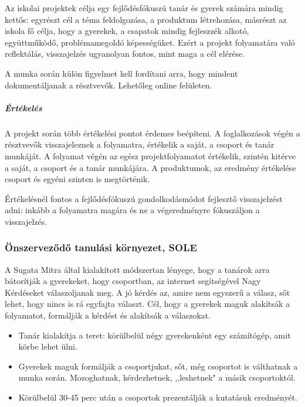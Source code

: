 Az iskolai projektek célja egy fejlődésfókuszú tanár és gyerek számára
mindig kettős: egyrészt cél a téma feldolgozása, a produktum
létrehozása, másrészt az iskola fő célja, hogy a gyerekek, a csapatok
mindig fejleszzék alkotó, együttműködő, problémamegoldó képességüket.
Ezért a projekt folyamatára való reflektálás, visszajelzés ugyanolyan
fontos, mint maga a cél elérése.

A munka során külön figyelmet kell fordítani arra, hogy mindent
dokumentáljanak a résztvevők. Lehetőleg online felületen.

\hypertarget{uxe9rtuxe9keluxe9s}{%
\subparagraph{Értékelés}\label{uxe9rtuxe9keluxe9s}}

A projekt során több értékelési pontot érdemes beépíteni. A
foglalkozások végén a résztvevők visszajeleznek a folyamatra, értékelik
a saját, a csoport és tanár munkáját. A folyamat végén az egész
projektfolyamatot értékelik, szintén kitérve a saját, a csoport és a
tanár munkájára. A produktumok, az eredmény értékelése csoport és egyéni
szinten is megtörténik.

Értékelésnél fontos a fejlődésfókuszú gondolkodásmódot fejlesztő
visszajelzést adni: inkább a folyamatra magára és ne a végeredményre
fókuszáljon a visszajelzés.

\hypertarget{uxf6nszervezux151dux151-tanuluxe1si-kuxf6rnyezet-sole}{%
\subsubsection{Önszerveződő tanulási környezet,
SOLE}\label{uxf6nszervezux151dux151-tanuluxe1si-kuxf6rnyezet-sole}}

A Sugata Mitra által kialakított módszertan lényege, hogy a tanárok arra
bátorítják a gyerekeket, hogy csoportban, az internet segítségével Nagy
Kérdéseket válaszoljanak meg. A jó kérdés az, amire nem egyszerű a
válasz, sőt lehet, hogy nincs is rá egyfajta választ. Cél, hogy a
gyerekek maguk alakítsák a folyamatot, formálják a kérdést és alakítsák
a válaszokat.

\begin{itemize}
\item
  Tanár kialakítja a teret: körülbelül négy gyerekenként egy számítógép,
  amit körbe lehet ülni.
\item
  Gyerekek maguk formálják a csoportjukat, sőt, még csoportot is
  válthatnak a munka során. Mozoghatnak, kérdezhetnek, ,,leshetnek" a
  másik csoportoktól.
\item
  Körülbelül 30-45 perc után a csoportok prezentálják a kutatásuk
  eredményét.
\end{itemize}

